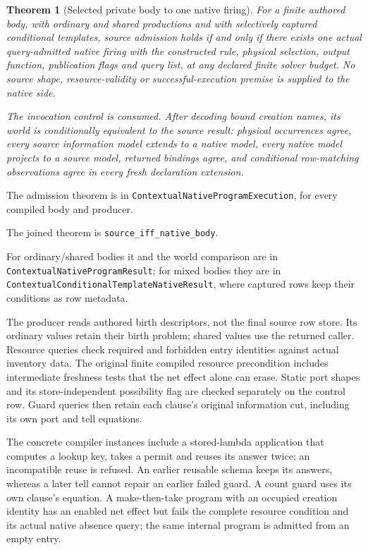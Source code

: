 \documentclass[11pt]{article}
\newtheorem{theorem}{Theorem}
\newcommand{\code}[1]{\texttt{\small #1}}
\begin{document}
\begin{theorem}[Selected private body to one native firing]
For a finite authored body, with ordinary and shared productions and with
selectively captured conditional templates, source admission holds if and only if there exists one
actual query-admitted native firing with the constructed rule, physical
selection, output function, publication flags and query list, at any
declared finite solver budget. No source shape, resource-validity or
successful-execution premise is supplied to the native side.

The invocation control is consumed. After decoding bound creation names,
its world is conditionally equivalent to the source result:
physical occurrences agree, every source information model extends to a
native model, every native model projects to a source model, returned
bindings agree, and conditional row-matching observations agree in every
fresh declaration extension.
\end{theorem}
The admission theorem is in \code{ContextualNativeProgramExecution}, for
every compiled body and producer.

The joined theorem is \code{source\_iff\_native\_body}.

For ordinary/shared bodies it and the world comparison are in
\code{ContextualNativeProgramResult}; for mixed bodies they are in
\code{ContextualConditionalTemplateNativeResult}, where captured rows keep
their conditions as row metadata.

The producer reads authored birth descriptors, not the final source row
store. Its ordinary values retain their birth problem; shared values use
the returned caller. Resource queries check required and forbidden entry
identities against actual inventory data. The original finite compiled
resource precondition includes intermediate freshness tests that the net
effect alone can erase. Static port shapes and its store-independent
possibility flag are checked separately on the control row. Guard queries
then retain each clause's original information cut, including its own
port and tell equations.

The concrete compiler instances include a stored-lambda application that
computes a lookup key, takes a permit and reuses its answer twice; an
incompatible reuse is refused. An earlier reusable schema keeps its
answers, whereas a later tell cannot repair an earlier failed guard.
A count guard uses its own clause's equation. A make-then-take program
with an occupied creation identity has an enabled net effect but fails
the complete resource condition and its actual native absence query;
the same internal program is admitted from an empty entry.
\end{document}
